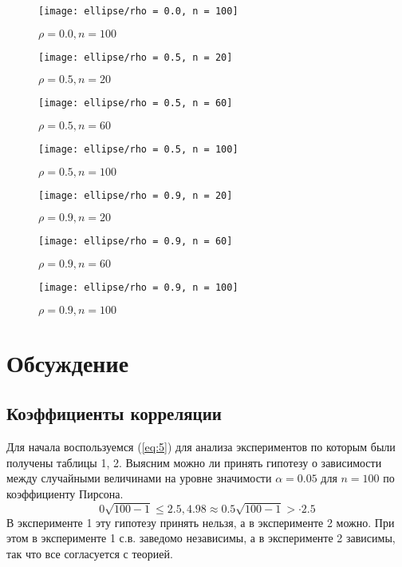 \documentclass[12pt,a4paper]{article}
\begin{document}
\begin{figure}[h!]
	\centering
	\texttt{[image: ellipse/rho = 0.0, n = 100]}
	\caption{$\rho = 0.0, n = 100$}
	\label{fig:image3}
\end{figure}
\begin{figure}[h!]
	\centering
	\texttt{[image: ellipse/rho = 0.5, n = 20]}
	\caption{$\rho = 0.5, n = 20$}
	\label{fig:image4}
\end{figure}
\pagebreak

\begin{figure}[h!]
	\centering
	\texttt{[image: ellipse/rho = 0.5, n = 60]}
	\caption{$\rho = 0.5, n = 60$}
	\label{fig:image5}
\end{figure}
\begin{figure}[h!]
	\centering
	\texttt{[image: ellipse/rho = 0.5, n = 100]}
	\caption{$\rho = 0.5, n = 100$}
	\label{fig:image6}
\end{figure}
\pagebreak

\begin{figure}[h!]
	\centering
	\texttt{[image: ellipse/rho = 0.9, n = 20]}
	\caption{$\rho = 0.9, n = 20$}
	\label{fig:image7}
\end{figure}
\begin{figure}[h!]
	\centering
	\texttt{[image: ellipse/rho = 0.9, n = 60]}
	\caption{$\rho = 0.9, n = 60$}
	\label{fig:image8}
\end{figure}
\pagebreak

\begin{figure}[h!]
	\centering
	\texttt{[image: ellipse/rho = 0.9, n = 100]}
	\caption{$\rho = 0.9, n = 100$}
	\label{fig:image9}
\end{figure}
\pagebreak

\section{Обсуждение}
\subsection{Коэффициенты корреляции}
Для начала воспользуемся (\ref{eq:5}) для анализа экспериментов по которым были получены таблицы 1, 2. Выясним можно ли принять гипотезу о зависимости между случайными величинами на уровне значимости $\alpha = 0.05$ для $n = 100$ по коэффициенту Пирсона.
$$0 \sqrt{100 - 1} \leq 2.5, 4.98 \approx 0.5 \sqrt{100 - 1} > \cdot 2.5$$ 
В эксперименте 1 эту гипотезу принять нельзя, а в эксперименте 2 можно. При этом в эксперименте 1 с.в. заведомо независимы, а в эксперименте 2 зависимы, так что все согласуется с теорией. 
\end{document}
